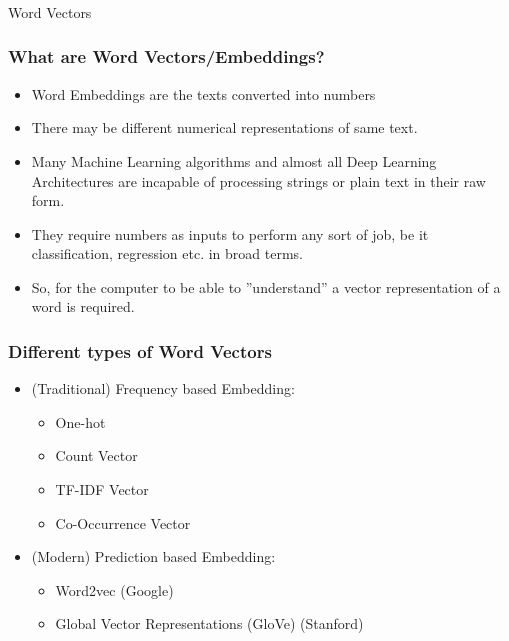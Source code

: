 \begin{frame}[fragile]\frametitle{}

\begin{center}
{\Large Word Vectors}
\end{center}
\end{frame}


\begin{frame}[fragile]\frametitle{What are Word Vectors/Embeddings?}
\begin{itemize}
\item Word Embeddings are the texts converted into numbers
\item There may be different numerical representations of  same text. 
\item Many Machine Learning algorithms and almost all Deep Learning Architectures are incapable of processing strings or plain text in their raw form. 
\item They require numbers as inputs to perform any sort of job, be it classification, regression etc. in broad terms.
\item So, for the computer to be able to ''understand'' a vector representation of a word is required.
\end{itemize}
\end{frame}

\begin{frame}[fragile]\frametitle{Different types of Word Vectors}
\begin{itemize}
\item (Traditional) Frequency based Embedding:
\begin{itemize}
\item One-hot
\item Count Vector
\item TF-IDF Vector
\item Co-Occurrence Vector
\end{itemize}
\item (Modern) Prediction based Embedding:
\begin{itemize}
\item Word2vec  (Google)
\item Global Vector Representations (GloVe)   (Stanford)
\end{itemize}
\end{itemize}
\end{frame}


